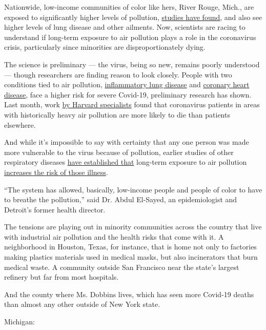 Nationwide, low-income communities of color like hers, River Rouge,
Mich., are exposed to significantly higher levels of pollution,
\href{https://ajph.aphapublications.org/doi/abs/10.2105/AJPH.2017.304297?journalCode=ajph}{studies
have found}, and also see higher levels of lung disease and other
ailments. Now, scientists are racing to understand if long-term exposure
to air pollution plays a role in the coronavirus crisis, particularly
since minorities are disproportionately dying.

The science is preliminary --- the virus, being so new, remains poorly
understood --- though researchers are finding reason to look closely.
People with two conditions tied to air pollution,
\href{https://www.resmedjournal.com/article/S0954-6111(20)30081-0/fulltext}{inflammatory
lung disease} and
\href{https://www.medrxiv.org/content/10.1101/2020.03.25.20043133v1}{coronary
heart disease}, face a higher risk for severe Covid-19, preliminary
research has shown. Last month, work
\href{https://www.nytimes3xbfgragh.onion/2020/04/07/climate/air-pollution-coronavirus-covid.html}{by
Harvard specialists} found that coronavirus patients in areas with
historically heavy air pollution are more likely to die than patients
elsewhere.

And while it's impossible to say with certainty that any one person was
made more vulnerable to the virus because of pollution, earlier studies
of other respiratory diseases
\href{https://www.ncbi.nlm.nih.gov/pubmed/14629774}{have established
that} long-term exposure to air pollution
\href{https://www.ncbi.nlm.nih.gov/pubmed/28966029}{increases the risk
of those illness}.

``The system has allowed, basically, low-income people and people of
color to have to breathe the pollution,'' said Dr. Abdul El-Sayed, an
epidemiologist and Detroit's former health director.

The tensions are playing out in minority communities across the country
that live with industrial air pollution and the health risks that come
with it. A neighborhood in Houston, Texas, for instance, that is home
not only to factories making plastics materials used in medical masks,
but also incinerators that burn medical waste. A community outside San
Francisco near the state's largest refinery but far from most hospitals.

And the county where Ms. Dobbins lives, which has seen more Covid-19
deaths than almost any other outside of New York state.

Michigan:

